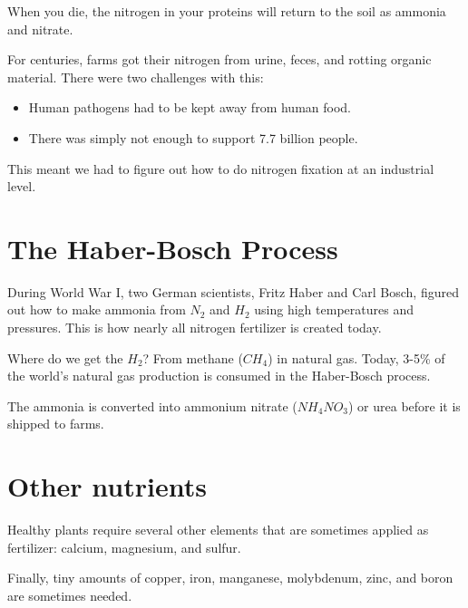 When you die, the nitrogen in your proteins will return to the soil as
ammonia and nitrate.

For centuries, farms got their nitrogen from urine, feces, and rotting
organic material. There were two challenges with this:
\begin{itemize}
\item Human pathogens had to be kept away from human food.
\item There was simply not enough to support 7.7 billion people.
\end{itemize}

This meant we had to figure out how to do nitrogen fixation at an industrial
level.

\section{The Haber-Bosch Process}

During World War I, two German scientists, Fritz Haber and Carl Bosch,
figured out how to make ammonia from $N_2$ and $H_2$ using high
temperatures and pressures. This is how nearly all nitrogen fertilizer
is created today.

Where do we get the $H_2$? From methane ($CH_4$) in natural gas. Today, 3-5\%
of the world's natural gas production is consumed in the Haber-Bosch
process.

The ammonia is converted into ammonium nitrate ($NH_4NO_3$) or urea
before it is shipped to farms.

\section{Other nutrients}

Healthy plants require several other elements that are sometimes
applied as fertilizer: calcium, magnesium, and sulfur.

Finally, tiny amounts of copper, iron, manganese, molybdenum, zinc, and
boron are sometimes needed.

